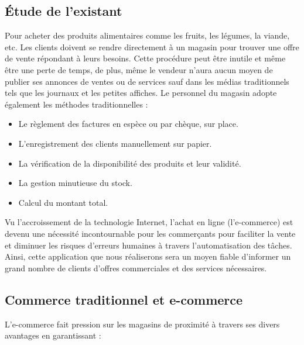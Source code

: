 \documentclass{report}
\begin{document}
\subsection{Étude de l’existant}
Pour acheter des produits alimentaires comme les fruits, les légumes, la viande, etc. Les clients doivent se rendre directement à un magasin pour trouver une offre de vente répondant à leurs besoins. Cette procédure peut être inutile et même être une perte de temps, de plus, même le vendeur n’aura aucun moyen de publier ses annonces de ventes ou de services sauf dans les médias traditionnels tels que les journaux et les petites affiches. Le personnel du magasin adopte également les méthodes traditionnelles :

\begin{itemize}
    \item Le règlement des factures en espèce ou par chèque, sur place.
    \item L’enregistrement des clients manuellement sur papier.
    \item La vérification de la disponibilité des produits et leur validité.
    \item La gestion minutieuse du stock.
    \item Calcul du montant total.
\end{itemize}

Vu l’accroissement de la technologie Internet, l’achat en ligne (l'e-commerce) est devenu une nécessité incontournable pour les commerçants pour faciliter la vente et diminuer les risques d'erreurs humaines à travers l'automatisation des tâches. Ainsi, cette application que nous réaliserons sera un moyen fiable d’informer un grand nombre de clients d'offres commerciales et des services nécessaires.

\subsection{Commerce traditionnel et e-commerce}
L'e-commerce fait pression sur les magasins de proximité à travers ses divers avantages en garantissant :
\end{document}
